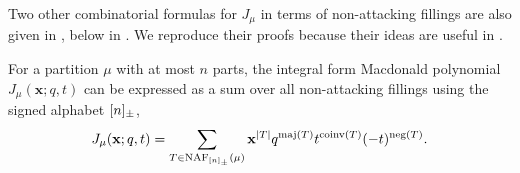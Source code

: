 Two other combinatorial formulas for \(J_\mu\) in terms of non-attacking fillings are also given in \cite{HHL05}, below in .
We reproduce their proofs because their ideas are useful in .

\begin{proposition} \label{prop:J-NAF-signed}
	For a partition \(\mu\) with at most \(n\) parts,
	the integral form Macdonald polynomial \(J_\mu(\mathbf{x}; q, t)\) can be expressed as a sum over all non-attacking fillings using the signed alphabet \([n]_\pm\),
\begin{equation} \label{eq:J-NAF-signed}
	J_\mu(\mathbf{x}; q, t)
	= \sum_{T \in \NAF[\interval{n}_\pm](\mu)}
	\mathbf{x}^{|T|}
	q^{\maj(T)}
	t^{\coinv(T)}
	(-t)^{\operatorname{neg}(T)}.
\end{equation}
\end{proposition}

